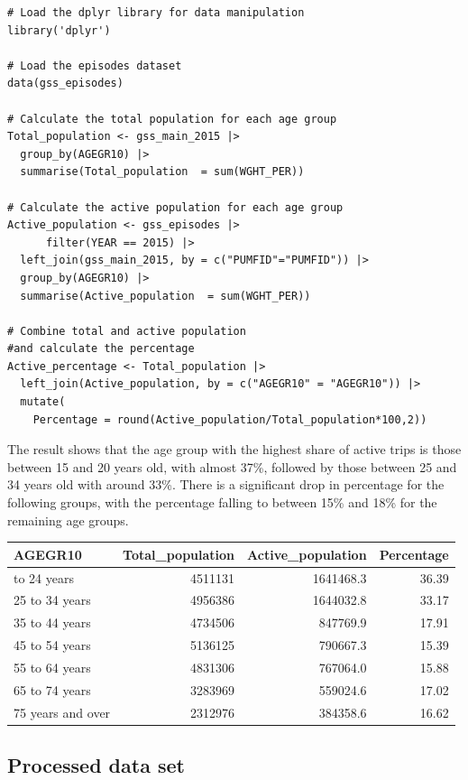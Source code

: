 \documentclass[Royal,times,sageh]{sagej}
\begin{document}
\begin{verbatim}
# Load the dplyr library for data manipulation
library('dplyr')

# Load the episodes dataset
data(gss_episodes) 

# Calculate the total population for each age group
Total_population <- gss_main_2015 |> 
  group_by(AGEGR10) |> 
  summarise(Total_population  = sum(WGHT_PER))

# Calculate the active population for each age group
Active_population <- gss_episodes |> 
      filter(YEAR == 2015) |> 
  left_join(gss_main_2015, by = c("PUMFID"="PUMFID")) |> 
  group_by(AGEGR10) |> 
  summarise(Active_population  = sum(WGHT_PER))

# Combine total and active population 
#and calculate the percentage
Active_percentage <- Total_population |> 
  left_join(Active_population, by = c("AGEGR10" = "AGEGR10")) |>
  mutate(
    Percentage = round(Active_population/Total_population*100,2))
\end{verbatim}

The result shows that the age group with the highest share of active
trips is those between 15 and 20 years old, with almost 37\%, followed
by those between 25 and 34 years old with around 33\%. There is a
significant drop in percentage for the following groups, with the
percentage falling to between 15\% and 18\% for the remaining age
groups.

\begin{longtable}[]{@{}lrrr@{}}
\toprule\noalign{}
AGEGR10 & Total\_population & Active\_population & Percentage \\
\midrule\noalign{}
\endhead
\bottomrule\noalign{}
\endlastfoot
15 to 24 years & 4511131 & 1641468.3 & 36.39 \\
25 to 34 years & 4956386 & 1644032.8 & 33.17 \\
35 to 44 years & 4734506 & 847769.9 & 17.91 \\
45 to 54 years & 5136125 & 790667.3 & 15.39 \\
55 to 64 years & 4831306 & 767064.0 & 15.88 \\
65 to 74 years & 3283969 & 559024.6 & 17.02 \\
75 years and over & 2312976 & 384358.6 & 16.62 \\
\end{longtable}

\subsection{Processed data set}\label{processed-data-set}
\end{document}
